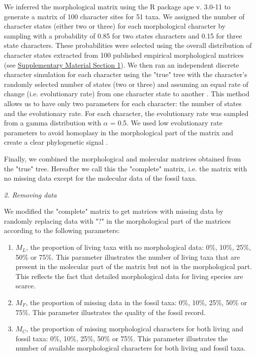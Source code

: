 \documentclass[12pt,letterpaper]{article}
\renewcommand{\subsection}[1]{%
\bigskip
\begin{center}
\begin{large}
\normalfont\itshape #1
\end{large}
\end{center}}
\begin{document}
We inferred the morphological matrix using the R package ape v. 3.0-11 \citep{paradisape:2004} to generate a matrix of 100 character sites for 51 taxa. We assigned the number of character states (either two or three) for each morphological character by sampling with a probability of 0.85 for two states characters and 0.15 for three state characters. These probabilities were selected using the overall distribution of character states extracted from 100 published empirical morphological matrices (see \hyperref[SupplementaryMaterial]{Supplementary Material Section 1}). We then ran an independent discrete character simulation for each character using the "true" tree with the character's randomly selected number of states (two or three) and assuming an equal rate of change (i.e. evolutionary rate) from one character state to another \citep{Pagel22011994}. This method allows us to have only two parameters for each character: the number of states and the evolutionary rate. For each character, the evolutionary rate was sampled from a gamma distribution with $\alpha$ = 0.5. We used low evolutionary rate parameters to avoid homoplasy in the morphological part of the matrix and create a clear phylogenetic signal \citep{wagner2000,davalosintegrating2014,wrightbayesian2014}.

Finally, we combined the morphological and molecular matrices obtained from the "true" tree. Hereafter we call this the "complete" matrix, i.e. the matrix with no missing data except for the molecular data of the fossil taxa.


\subsection{2. Removing data}
\label{Removing_data}
We modified the "complete" matrix to get matrices with missing data by randomly replacing data with "?" in the morphological part of the matrices according to the following parameters:

\begin{enumerate}
\item{$M_{L}$, the proportion of living taxa with no morphological data: 0\%, 10\%, 25\%, 50\% or 75\%.}
This parameter illustrates the number of living taxa that are present in the molecular part of the matrix but not in the morphological part. This reflects the fact that detailed morphological data for living species are scarce.
\item{$M_{F}$, the proportion of missing data in the fossil taxa: 0\%, 10\%, 25\%, 50\% or 75\%.}
This parameter illustrates the quality of the fossil record. 
\item{$M_{C}$, the proportion of missing morphological characters for both living and fossil taxa: 0\%, 10\%, 25\%, 50\% or 75\%. }
This parameter illustrates the number of available morphological characters for both living and fossil taxa.
\end{enumerate}
\end{document}
